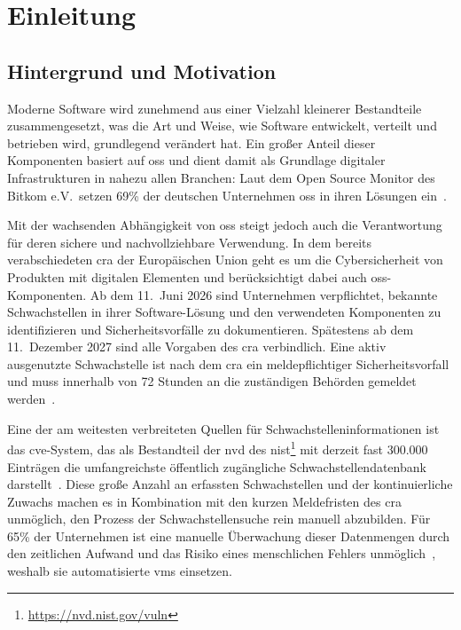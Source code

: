 \chapter{Einleitung}\label{ch:einleitung}


\section{Hintergrund und Motivation}\label{sec:hintergrund-motivation}

Moderne Software wird zunehmend aus einer Vielzahl kleinerer Bestandteile zusammengesetzt, was die Art und Weise, wie Software entwickelt, verteilt und betrieben wird, grundlegend verändert hat.
Ein großer Anteil dieser Komponenten basiert auf \acrfull{oss} und dient damit als Grundlage digitaler Infrastrukturen in nahezu allen Branchen:
Laut dem Open Source Monitor des Bitkom e.V.\ setzen 69\% der deutschen Unternehmen \acrshort{oss} in ihren Lösungen ein\ \autocite{OpenSourceMonitorWintergerst}.

Mit der wachsenden Abhängigkeit von \acrshort{oss} steigt jedoch auch die Verantwortung für deren sichere und nachvollziehbare Verwendung.
In dem bereits verabschiedeten \acrfull{cra} der Europäischen Union geht es um die Cybersicherheit von Produkten mit digitalen Elementen und berücksichtigt dabei auch \acrshort{oss}-Komponenten.
Ab dem 11.\ Juni 2026 sind Unternehmen verpflichtet, bekannte Schwachstellen in ihrer Software-Lösung und den verwendeten Komponenten zu identifizieren und Sicherheitsvorfälle zu dokumentieren.
Spätestens ab dem 11.\ Dezember 2027 sind alle Vorgaben des \acrshort{cra} verbindlich.
Eine aktiv ausgenutzte Schwachstelle ist nach dem \acrshort{cra} ein meldepflichtiger Sicherheitsvorfall und muss innerhalb von 72 Stunden an die zuständigen Behörden gemeldet werden\ \autocite{eu2024cra}.

Eine der am weitesten verbreiteten Quellen für Schwachstelleninformationen ist das \acrfull{cve}-System, das als Bestandteil der \acrfull{nvd} des \acrfull{nist}\footnote{\url{https://nvd.nist.gov/vuln}} mit derzeit fast 300.000 Einträgen die umfangreichste öffentlich zugängliche Schwachstellendatenbank darstellt\ \autocite{nvd12mai2025dashboard}.
Diese große Anzahl an erfassten Schwachstellen und der kontinuierliche Zuwachs machen es in Kombination mit den kurzen Meldefristen des \acrshort{cra} unmöglich, den Prozess der Schwachstellensuche rein manuell abzubilden.
Für 65\% der Unternehmen ist eine manuelle Überwachung dieser Datenmengen durch den zeitlichen Aufwand und das Risiko eines menschlichen Fehlers unmöglich\ \autocite{OpenSourceMonitorWintergerst}, weshalb sie automatisierte \acrfull{vms} einsetzen.

